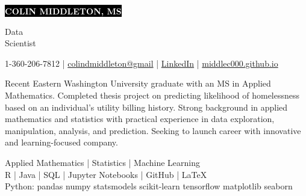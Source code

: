 \documentclass[11pt]{developercv} %
\newcommand{\vsp}{\vspace{-10pt}}
\begin{document}
\setlength{\abovedisplayskip}{0pt}
\setlength{\belowdisplayskip}{0pt}

\begin{minipage}{0.75\textwidth}
	\colorbox{black}{{\HUGE\textcolor{white}{\textbf{\MakeUppercase{Colin Middleton, MS}}}}}
\end{minipage}
\begin{minipage}{0.25\textwidth}
	{\huge Data \\Scientist}
\end{minipage}

\vspace{-5pt}
\begin{center}
	1-360-206-7812
	\hspace{0.25cm} | \hspace{0.25cm}
	\href{mailto:colindmiddleton@gmail.com}{colindmiddleton@gmail}
	\hspace{0.25cm} | \hspace{0.25cm}
	\href{https://www.linkedin.com/in/colin-middleton-000/}{LinkedIn}
	\hspace{0.25cm} | \hspace{0.25cm}
	\href{https://middlec000.github.io/}{middlec000.github.io}
\end{center}
\vsp


Recent Eastern Washington University graduate with an MS in Applied Mathematics. Completed thesis project on predicting likelihood of homelessness based on an individual's utility billing history. Strong background in applied mathematics and statistics with practical experience in data exploration, manipulation, analysis, and prediction. Seeking to launch career with innovative and learning-focused company.

\vsp
\begin{center}
	Applied Mathematics \quad | \quad Statistics \quad | \quad Machine Learning
	\\
	\vspace{0.25cm}
	R \quad | \quad Java \quad | \quad SQL \quad | \quad
	Jupyter Notebooks \quad | \quad GitHub \quad | \quad LaTeX
	\\
	\vspace{0.25cm}
	Python: \quad pandas \quad numpy \quad statsmodels \quad scikit-learn \quad tensorflow \quad matplotlib \quad seaborn
\end{center}
\vsp
\end{document}
